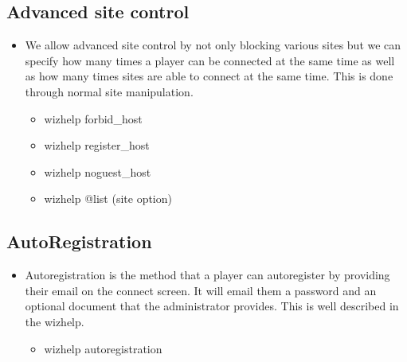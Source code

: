 \documentclass[letterpaper,10pt,english]{sphinxmanual}
\begin{document}
\subsection{Advanced site control}
\label{\detokenize{features:advanced-site-control}}\begin{itemize}
\item {} 
\sphinxAtStartPar
We allow advanced site control by not only blocking various sites
but we can specify how many times a player can be connected at the
same time as well as how many times sites are able to connect at
the same time.  This is done through normal site manipulation.
\begin{itemize}
\item {} 
\sphinxAtStartPar
wizhelp forbid\_host

\item {} 
\sphinxAtStartPar
wizhelp register\_host

\item {} 
\sphinxAtStartPar
wizhelp noguest\_host

\item {} 
\sphinxAtStartPar
wizhelp @list (site option)

\end{itemize}

\end{itemize}


\subsection{Auto\sphinxhyphen{}Registration}
\label{\detokenize{features:auto-registration}}\begin{itemize}
\item {} 
\sphinxAtStartPar
Autoregistration is the method that a player can auto\sphinxhyphen{}register
by providing their email on the connect screen.  It will email
them a password and an optional document that the administrator
provides.  This is well described in the wizhelp.
\begin{itemize}
\item {} 
\sphinxAtStartPar
wizhelp autoregistration

\end{itemize}

\end{itemize}
\end{document}
